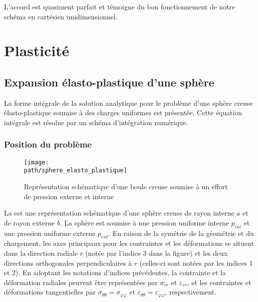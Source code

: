 \documentclass[10pt]{book}
\def\path{./fig}
\begin{document}
L'accord est quasiment parfait et témoigne du bon fonctionnement de notre schéma en cartésien unidimensionnel.
\FloatBarrier
\section{Plasticité}
\subsection{Expansion élasto-plastique d'une sphère}
La forme intégrale de la solution analytique pour le problème d'une sphère creuse élasto-plastique soumise à des charges uniformes est présentée. Cette équation intégrale est résolue par un schéma d'intégration numérique.
\subsubsection{Position du problème}
\begin{figure}[h!]
\centering \texttt{[image: \\path/sphere\_elasto\_plastique]}
\caption{Représentation schématique d'une boule creuse soumise à un effort de pression externe et interne}
\label{fig:sphere_elasto_plastique}
\end{figure}
La  est une représentation schématique d'une sphère creuse de rayon interne $a$ et de rayon externe $b$. La sphère est soumise à une pression uniforme interne $p_{int}$ et une pression uniforme externe $p_{ext}$. En raison de la symétrie de la géométrie et du chargement, les axes principaux pour les contraintes et les déformations se situent dans la direction radiale $r$ (notée par l'indice 3 dans la figure) et les deux directions orthogonales perpendiculaires à $r$ (celles-ci sont notées par les indices 1 et 2). En adoptant les notations d'indices précédentes, la contrainte et la déformation radiales peuvent être représentées par $\sigma_{rr}$ et $\varepsilon_{rr}$, et les contraintes et déformations tangentielles par $\sigma_{\theta\theta} = \sigma_{\varphi\varphi}$ et $\varepsilon_{\theta\theta} = \varepsilon_{\varphi\varphi}$, respectivement.
\end{document}
